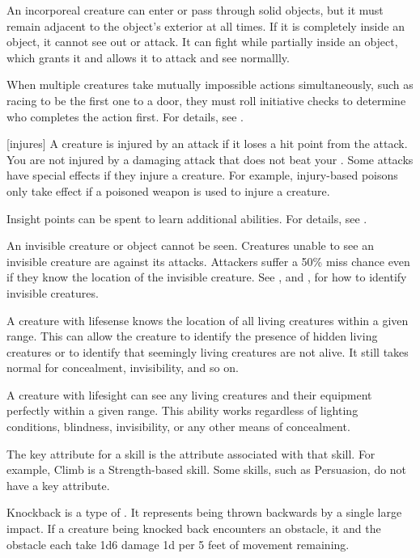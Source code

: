 An incorporeal creature can enter or pass through solid objects, but it must remain adjacent to the object's exterior at all times.
If it is completely inside an object, it cannot see out or attack.
It can fight while partially inside an object, which grants it  and allows it to attack and see normallly.

 When multiple creatures take mutually impossible actions simultaneously, such as racing to be the first one to a door, they must roll initiative checks to determine who completes the action first.
For details, see .

[injures] A creature is injured by an attack if it loses a hit point from the attack.
You are not injured by a damaging attack that does not beat your .
Some attacks have special effects if they injure a creature.
For example, injury-based poisons only take effect if a poisoned weapon is used to injure a creature.

 Insight points can be spent to learn additional abilities.
For details, see .

 An invisible creature or object cannot be seen. Creatures unable to see an invisible creature are  against its attacks. Attackers suffer a 50\% miss chance even if they know the location of the invisible creature. See , and , for how to identify invisible creatures.

 A creature with lifesense knows the location of all living creatures within a given range.
This can allow the creature to identify the presence of hidden living creatures or to identify that seemingly living creatures are not alive.
It still takes normal  for concealment, invisibility, and so on.

 A creature with lifesight can see any living creatures and their equipment perfectly within a given range.
This ability works regardless of lighting conditions, blindness, invisibility, or any other means of concealment.

 The key attribute for a skill is the attribute associated with that skill.
For example, Climb is a Strength-based skill.
Some skills, such as Persuasion, do not have a key attribute.

 Knockback is a type of .
It represents being thrown backwards by a single large impact.
If a creature being knocked back encounters an obstacle, it and the obstacle each take 1d6 damage \add 1d per 5 feet of movement remaining.

